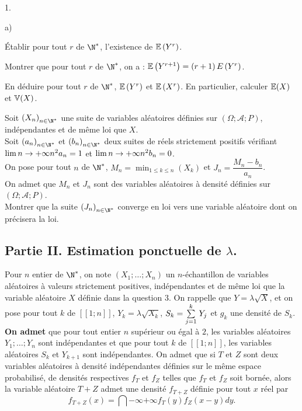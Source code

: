 \documentclass[11pt]{article}%
\begin{document}
\begin{noliste}{1.}
\begin{noliste}{a)}
\item Établir pour tout $r$ de $\N^{*}$, l'existence de $\mathbb{E}\left(
Y^{r}\right) $.

\item Montrer que pour tout $r$ de $\N^{*}$, on a : $\mathbb{E}\left(
Y^{r + 1}\right) = \left( r + 1\right) E\left( Y^{r}\right) $.

\item En déduire pour tout $r$ de $\N^{*}$, $\mathbb{E}\left(
Y^{r}\right) $ et $\mathbb{E}\left( X^{r}\right) $. En particulier, calculer
$\mathbb{E}(X)$
et $\mathbb{V}(X)$.
\end{noliste}

\item Soit $\left( X_{n}\right) _{n\in\N^{\ast}}$ une suite de
variables aléatoires définies sur $(\Omega;\mathcal{A};P)$,
indépendantes et de même loi que $X$. \\
 Soit $\left(
a_{n}\right) _{n\in\N^{\ast}}$ et $\left( b{}_{n}\right)
_{n\in\N^{\ast}}$ deux suites de réels strictement positifs
vérifiant ${\lim{n\rightarrow + \infty}n^{2}a_{n} = 1}$ et
${\lim{n\rightarrow + \infty}n^{2}b_{n} = 0}$. \\
 On pose
pour tout $n$ de $\N^{\ast}$, $M_{n} = {\min_{1\leq
k\leq n}\left( X_{k}\right) }$ et $J_{n} = \dfrac{M_{n}-b_{n}}{a_{n}}$.
\\
 On admet que $M_{n}$ et $J_{n}$ sont des variables aléatoires
à densité définies sur $(\Omega;\mathcal{A};P)$. \\
 Montrer
que la suite $\left( J_{n}\right) _{n\in\N^{\ast}}$ converge en loi
vers une variable aléatoire dont on précisera la loi.
\end{noliste}

\subsection*{Partie II. Estimation ponctuelle de $\lambda$.}

\begin{flushleft}
Pour $n$ entier de $\N^{\ast}$, on note $\left( X_{1};\ldots
;X_{n}\right) $ un $n$-échantillon de variables aléatoires à
valeurs strictement positives, indépendantes et de même loi que la
variable aléatoire $X$ définie dans la question 3. On rappelle que
$Y = \lambda\sqrt{X}$, et on pose pour tout $k$ de $\left[ \!\left[
1;n\right] \!\right] $, $Y_{k} = \lambda\sqrt{X_{k}}$, $S_{k} = {{\textstyle\sum\limits_{j
= 1}^{k}}\hspace{.1cm}Y_{j}}$ et $g_{k}$ une densité de $S_{k}$.\\
\textbf{On admet} que pour tout entier $n$ supérieur ou égal
à $2$, les variables aléatoires $Y_{1};\ldots;Y_{n}$ sont
indépendantes et que pour tout $k$ de $\left[ \!\left[ 1;n\right]
\!\right] $, les variables aléatoires $S_{k}$ et $Y_{k + 1}$ sont
indépendantes. On admet que si $T$ et $Z$ sont deux variables
aléatoires à densité indépendantes définies sur le
même espace probabilisé, de densités respectives $f_{T}$ et
$f_{Z}$ telles que $f_{T}$ et $f_{Z}$ soit bornée, alors la variable
aléatoire $T + Z$ admet une densité $f_{T + Z}$ définie pour tout $x$
réel par
\[
f_{T + Z}\left( x\right) = \dint{-\infty}{+ \infty} f_{T}\left(
y\right)
f_{Z}\left( x-y\right) dy.
\]

\end{flushleft}
\end{document}
